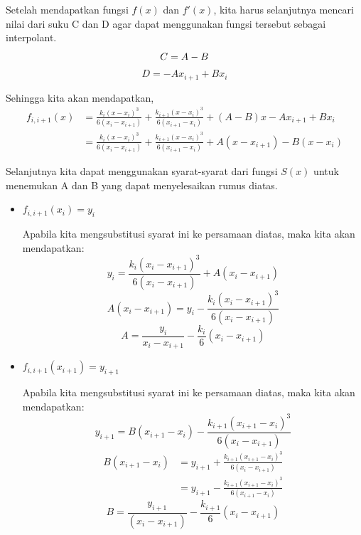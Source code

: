 \documentclass[journal,12pt,onecolumn,a4paper]{IEEEtran}
\begin{document}
Setelah mendapatkan fungsi \(f(x)\) dan \(f'(x)\), kita harus selanjutnya mencari nilai dari suku C dan D agar dapat menggunakan fungsi tersebut sebagai interpolant.
\begin{equation}
	C = A - B\\
\end{equation}
\begin{equation}
	D = -Ax_{i+1} + Bx_i
\end{equation}

Sehingga kita akan mendapatkan,
\begin{equation}
	\begin{split}
		f_{i, i+1}(x) & = \frac{k_i(x-x_i)^3}{6(x_i - x_{i+1})} + \frac{k_{i+1}(x - x_i)^3}{6(x_{i+1} - x_i)} + (A-B)x - Ax_{i+1} + Bx_i\\
		& = \frac{k_i(x-x_i)^3}{6(x_i - x_{i+1})} + \frac{k_{i+1}(x - x_i)^3}{6(x_{i+1} - x_i)} + A(x-x_{i+1}) - B(x-x_i)
	\end{split}
\end{equation}

Selanjutnya kita dapat menggunakan syarat-syarat dari fungsi \(S(x)\) untuk menemukan A dan B yang dapat menyelesaikan rumus diatas.

\begin{itemize}
	\item
	      \(f_{i, i+1}(x_i) = y_i\)

	      Apabila kita mengsubstitusi syarat ini ke persamaan diatas, maka kita akan mendapatkan:
	      \begin{equation*}
		      y_i = \frac{k_i(x_i - x_{i+1})^3}{6(x_i - x_{i+1})} + A(x_i - x_{i+1})
	      \end{equation*}
	      \begin{equation*}
		      A(x_i - x_{i+1}) = y_i - \frac{k_i(x_i - x_{i+1})^3}{6(x_i - x_{i+1})}
	      \end{equation*}
	      \begin{equation}
		      A = \frac{y_i}{x_i - x_{i+1}} - \frac{k_i}{6}(x_i - x_{i+1})
	      \end{equation}

	\item
	      \(f_{i, i+1}(x_{i+1}) = y_{i+1}\)

	      Apabila kita mengsubstitusi syarat ini ke persamaan diatas, maka kita akan mendapatkan:
	      \begin{equation*}
		      y_{i+1} = B(x_{i+1} - x_i) - \frac{k_{i+1}(x_{i+1}-x_i)^3}{6(x_i - x_{i + 1})}
	      \end{equation*}
	      \begin{equation*}
		      \begin{split}
			      B(x_{i+1} - x_i) & = y_{i+1} + \frac{k_{i+1}(x_{i+1}-x_i)^3}{6(x_i - x_{i + 1})}\\
			      & = y_{i+1} - \frac{k_{i+1}(x_{i+1}-x_i)^3}{6(x_{i + 1} - x_i)}
		      \end{split}
	      \end{equation*}
	      \begin{equation}
		      B = \frac{y_{i+1}}{(x_i - x_{i+1})} - \frac{k_{i+1}}{6}(x_i - x_{i+1})
	      \end{equation}
\end{itemize}
\end{document}
